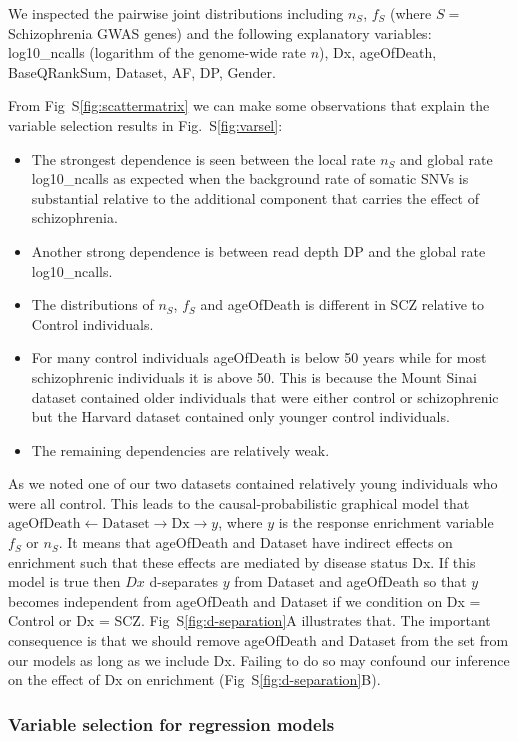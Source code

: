 \documentclass[letterpaper]{article}
\begin{document}
We inspected the pairwise joint distributions including $n_S$, $f_S$ (where
$S=$ Schizophrenia GWAS genes) and the following explanatory variables:
log10\_ncalls (logarithm of the genome-wide rate $n$), Dx, ageOfDeath,
BaseQRankSum, Dataset, AF, DP, Gender.

From Fig~S\ref{fig:scattermatrix} we can make some observations that explain
the variable selection results in Fig.~S\ref{fig:varsel}:
\begin{itemize}
\item The strongest dependence is seen between the local rate
	\(n_S\) and global rate log10\_ncalls as expected
	when the background rate of somatic SNVs is
	substantial relative to the additional component that carries the
	effect of schizophrenia.
\item Another strong dependence is between read depth DP and
	the global rate log10\_ncalls.
\item The distributions of $n_S$, $f_S$ and ageOfDeath is different in SCZ
	relative to Control individuals.
\item For many control individuals ageOfDeath is below 50 years while for
	most schizophrenic individuals it is above 50.  This is
	because the Mount Sinai dataset contained older individuals
	that were either control or schizophrenic but the Harvard dataset contained
	only younger control individuals.
\item The remaining dependencies are relatively weak.
\end{itemize}

As we noted one of our two datasets contained relatively young individuals who
were all control.  This leads to the causal-probabilistic graphical model that
\(\mathrm{ageOfDeath} \leftarrow \mathrm{Dataset} \rightarrow \mathrm{Dx}
\rightarrow y\), where \(y\) is the response enrichment variable \(f_S\) or
\(n_S\).  It means that ageOfDeath and Dataset have indirect effects on
enrichment such that these effects are mediated by disease status Dx. If this
model is true then \(Dx\) d-separates \(y\) from Dataset and ageOfDeath so
that \(y\) becomes independent from ageOfDeath and Dataset if we condition on
Dx = Control or Dx = SCZ.  Fig~S\ref{fig:d-separation}A illustrates
that.  The important consequence is that we should remove ageOfDeath and
Dataset from the set from our models as long as we include Dx.  Failing to do
so may confound our inference on the effect of Dx on enrichment
(Fig~S\ref{fig:d-separation}B).

\subsubsection*{Variable selection for regression models}
\end{document}
